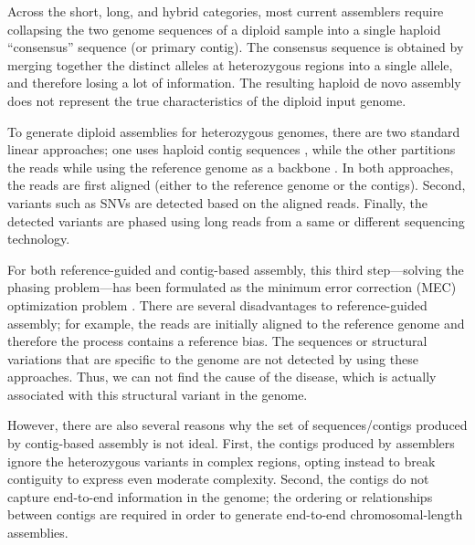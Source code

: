 Across the short, long, and hybrid categories, most current assemblers \citep{sohn2016present} require collapsing the two genome sequences of a diploid sample into a single haploid ``consensus'' sequence (or primary contig). 
The consensus sequence is obtained by merging together the distinct alleles at heterozygous regions into a single allele, and therefore losing a lot of information.
The resulting haploid de novo assembly does not represent the true characteristics of the diploid input genome. 

To generate diploid assemblies for heterozygous genomes, there are two standard linear approaches; 
one uses haploid contig sequences \citep{chin2016phased, pendleton2015assembly, seo2016novo, mostovoy2016hybrid}, 
while the other partitions the reads while using the reference genome as a backbone \citep{Glusman2014, martin2016whatshap, chaisson2017multi}.
In both approaches, the reads are first aligned (either to the reference genome or the contigs). Second, variants such as SNVs are detected based on the aligned reads. 
Finally, the detected variants are phased using long reads from a same or different sequencing technology.

For both reference-guided and contig-based assembly, this third step---solving the phasing problem---has been formulated as the minimum error correction (MEC) optimization problem \citep{lippert2002algorithmic,Cilibrasi2007}.
There are several disadvantages to reference-guided assembly; for example, the reads are initially aligned to the reference genome and therefore the process contains a reference bias. 
The sequences or structural variations that are specific to the genome are not detected by using these approaches. 
Thus, we can not find the cause of the disease, which is actually associated with this structural variant in the genome.

However, there are also several reasons why the set of sequences/contigs produced by contig-based assembly is not ideal.
First, the contigs produced by assemblers ignore the heterozygous variants in complex regions, opting instead to break contiguity to express even moderate complexity. 
Second, the contigs do not capture end-to-end information in the genome; the ordering or relationships between contigs are required in order to generate end-to-end chromosomal-length assemblies.

